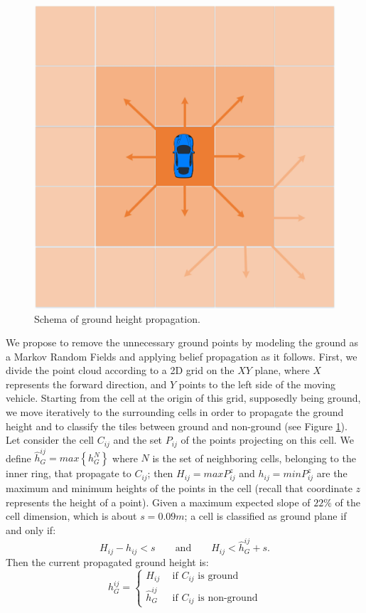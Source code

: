 \begin{figure}[t]
\centering
\includegraphics[width=0.99\columnwidth]{./img/ch-laser/groundpropagation}
\caption{Schema of ground height propagation.}
\label{fig:propag}
\end{figure}

We propose to remove the unnecessary ground points by modeling the ground as a Markov Random Fields and applying belief propagation as it follows. 
First, we divide the point cloud according to a 2D grid on the $XY$ plane, where $X$ represents the forward direction, and $Y$ points to the left side of the moving vehicle. 
Starting from the cell at the origin of this grid, supposedly being ground, we move iteratively to the surrounding cells in order to propagate the ground height and to classify the tiles between ground and non-ground (see Figure \ref{fig:propag}).
Let consider the cell $C_{ij}$ and the set $P_{ij}$ of the points projecting on this cell. We define $\hat{h}_G^{ij} = max\left\{h_G^N\right\}$ where $N$ is the set of neighboring cells, belonging to the inner ring, that propagate to  $C_{ij}$; then $H_{ij} = max{P_{ij}^z}$ and $h_{ij} = min{P_{ij}^z}$ are the maximum and minimum heights of the points in the cell (recall that coordinate $z$ represents the height of a point). 
Given a maximum expected slope of $22\%$ of the cell dimension, which is about $s=0.09m$; a cell is classified as ground plane if and only if:
\begin{equation}
H_{ij} - h_{ij} < s \qquad \text{and} \qquad H_{ij} < \hat{h}_G^{ij} + s.
\end{equation}
Then the current propagated ground height is:
\begin{equation}
   h_G^{ij} =  
      \begin{cases}
               H_{ij} \ \ & \text{if ${C}_{ij}$ is ground}\\
               \hat{h}_G^{ij} \ \ & \text{if ${C}_{ij}$ is non-ground}
        \end{cases}
\end{equation}

